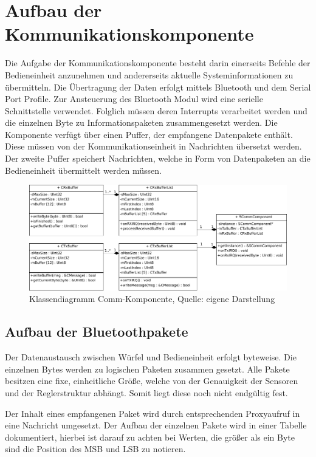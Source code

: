 \documentclass{article}
\begin{document}
\newpage
\section{Aufbau der Kommunikationskomponente}
Die Aufgabe der Kommunikationskomponente besteht darin einerseits Befehle der Bedieneinheit anzunehmen und andererseits aktuelle Systeminformationen zu übermitteln. Die Übertragung der Daten erfolgt mittels Bluetooth und dem Serial Port Profile. Zur Ansteuerung des Bluetooth Modul wird eine serielle Schnittstelle verwendet. Folglich müssen deren Interrupts verarbeitet werden und die einzelnen Byte zu Informationspaketen zusammengesetzt werden. 
Die Komponente verfügt über einen Puffer, der empfangene Datenpakete enthält. Diese müssen von der Kommunikationseinheit in Nachrichten übersetzt werden. Der zweite Puffer speichert Nachrichten, welche in Form von Datenpaketen an die Bedieneinheit übermittelt werden müssen.

\begin{figure}[h]
	\includegraphics[width=\linewidth]{CommBuffer}
	\caption{Klassendiagramm Comm-Komponente, Quelle: eigene Darstellung}
\end{figure}

\subsection*{Aufbau der Bluetoothpakete}
Der Datenaustausch zwischen Würfel und Bedieneinheit erfolgt byteweise. Die einzelnen Bytes werden zu logischen Paketen zusammen gesetzt. Alle Pakete besitzen eine fixe, einheitliche Größe, welche von der Genauigkeit der Sensoren und der Reglerstruktur abhängt. Somit liegt diese noch nicht endgültig fest. 

Der Inhalt eines empfangenen Paket wird durch entsprechenden Proxyaufruf in eine Nachricht umgesetzt. Der Aufbau der einzelnen Pakete wird in einer Tabelle dokumentiert, hierbei ist darauf zu achten bei Werten, die größer als ein Byte sind die Position des MSB und LSB zu notieren.
\end{document}
